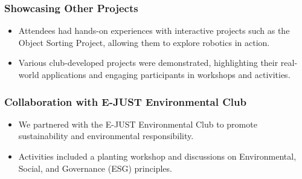 \documentclass[11pt, twocolumn]{article}
\begin{document}
\subsubsection{Showcasing Other Projects}
\begin{itemize}
    \item Attendees had hands-on experiences with interactive projects such as the Object Sorting Project, allowing them to explore robotics in action.
    \item Various club-developed projects were demonstrated, highlighting their real-world applications and engaging participants in workshops and activities.
\end{itemize}

\subsubsection{Collaboration with E-JUST Environmental Club}
\begin{itemize}
    \item We partnered with the E-JUST Environmental Club to promote sustainability and environmental responsibility.
    \item Activities included a planting workshop and discussions on Environmental, Social, and Governance (ESG) principles.
\end{itemize}
\end{document}
